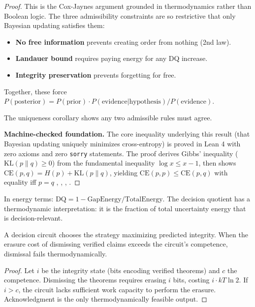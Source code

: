 \begin{proof}
This is the Cox-Jaynes argument grounded in thermodynamics rather than Boolean logic.
The three admissibility constraints are so restrictive that only Bayesian updating satisfies them:
\begin{itemize}
  \item \textbf{No free information} prevents creating order from nothing (2nd law).
  \item \textbf{Landauer bound} requires paying energy for any DQ increase.
  \item \textbf{Integrity preservation} prevents forgetting for free.
\end{itemize}
Together, these force $P(\text{posterior}) = P(\text{prior}) \cdot P(\text{evidence}|\text{hypothesis}) / P(\text{evidence})$.

The uniqueness corollary  shows any two admissible rules must agree.

\textbf{Machine-checked foundation.} The core inequality underlying this result (that Bayesian updating uniquely minimizes cross-entropy) is proved in Lean 4 with zero axioms and zero \texttt{sorry} statements. The proof derives Gibbs' inequality ($\mathrm{KL}(p\|q) \geq 0$) from the fundamental inequality $\log x \leq x - 1$, then shows $\mathrm{CE}(p,q) = H(p) + \mathrm{KL}(p\|q)$, yielding $\mathrm{CE}(p,p) \leq \mathrm{CE}(p,q)$ with equality iff $p = q$ , , , .
\end{proof}

\begin{corollary}\label{cor:thermo-dq}
In energy terms: $\mathrm{DQ} = 1 - \text{GapEnergy}/\text{TotalEnergy}$. The decision quotient has a thermodynamic interpretation: it is the fraction of total uncertainty energy that is decision-relevant.
\end{corollary}

\begin{proposition}\label{prop:landauer-constraint}
A decision circuit chooses the strategy maximizing predicted integrity. When the erasure cost of dismissing verified claims exceeds the circuit's competence, dismissal fails thermodynamically.
\end{proposition}

\begin{proof}
Let $i$ be the integrity state (bits encoding verified theorems) and $c$ the competence. Dismissing the theorems requires erasing $i$ bits, costing $i \cdot kT\ln 2$. If $i > c$, the circuit lacks sufficient work capacity to perform the erasure. Acknowledgment is the only thermodynamically feasible output.
\end{proof}

